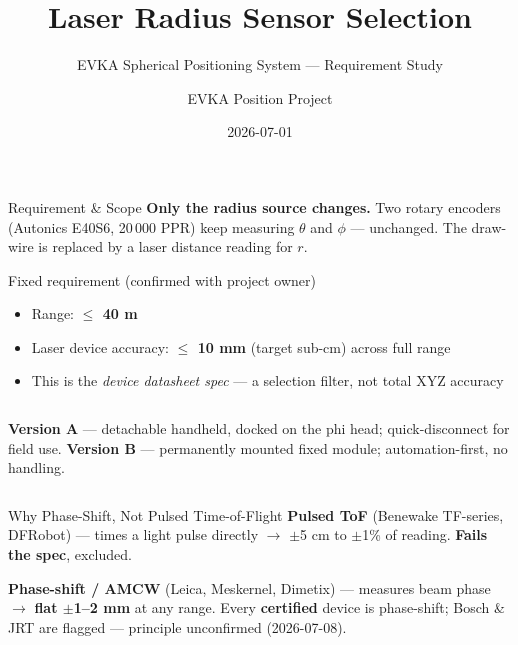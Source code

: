 \documentclass[aspectratio=169,11pt]{beamer}
\title{Laser Radius Sensor Selection}
\subtitle{EVKA Spherical Positioning System --- Requirement Study}
\author{EVKA Position Project}
\date{2026-07-01}
\begin{document}
\maketitle

\begin{frame}{Requirement \& Scope}
  \textbf{Only the radius source changes.} Two rotary encoders (Autonics E40S6,
  20\,000 PPR) keep measuring $\theta$ and $\phi$ --- unchanged. The draw-wire is
  replaced by a laser distance reading for $r$.
  \vspace{0.6em}

  \begin{block}{Fixed requirement (confirmed with project owner)}
    \begin{itemize}
      \item Range: \textbf{$\leq$ 40 m}
      \item Laser device accuracy: \textbf{$\leq$ 10 mm} (target sub-cm) across full range
      \item This is the \emph{device datasheet spec} --- a selection filter, not total XYZ accuracy
    \end{itemize}
  \end{block}
  \vspace{0.3em}

  \begin{columns}[t]
    \textbf{Version A} --- detachable handheld, docked on the phi head; quick-disconnect for field use.
    \textbf{Version B} --- permanently mounted fixed module; automation-first, no handling.
  \end{columns}
\end{frame}

\begin{frame}{Why Phase-Shift, Not Pulsed Time-of-Flight}
  \textbf{Pulsed ToF} (Benewake TF-series, DFRobot) --- times a light pulse
  directly $\rightarrow$ \alert{$\pm$5 cm to $\pm$1\% of reading}.
  \textbf{Fails the spec}, excluded.
  \vspace{1em}

  \textbf{Phase-shift / AMCW} (Leica, Meskernel, Dimetix) --- measures beam
  phase $\rightarrow$ \textbf{flat $\pm$1--2 mm} at any range.
  Every \textbf{certified} device is phase-shift; Bosch \& JRT are
  \alert{flagged} --- principle unconfirmed (2026-07-08).
\end{frame}
\end{document}
